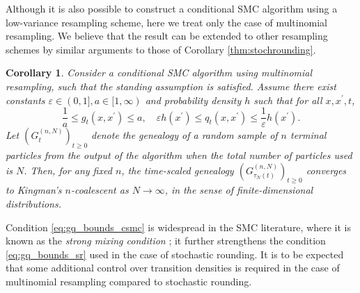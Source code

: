 \documentclass{article} %
\newtheorem{corollary}{Corollary}
\theoremstyle{definition}
\newcommand{\1}[1]{\mathbbm{1}_{\{#1\}}}
\begin{document}
Although it is also possible to construct a conditional SMC algorithm using a low-variance resampling scheme, here we treat only the case of multinomial resampling. We believe that the result can be extended to other resampling schemes by similar arguments to those of Corollary \ref{thm:stochrounding}.

\begin{corollary}\label{thm:CSMC_newassns}
Consider a conditional SMC algorithm using multinomial resampling, such that the standing assumption is satisfied. Assume there exist constants $\varepsilon\in (0,1], a\in [1,\infty)$ and probability density $h$ such that for all $x, x^\prime, t$,
\begin{equation}\label{eq:gq_bounds_csmc}
\frac{1}{a} \leq g_t(x, x^\prime) \leq a , \quad
\varepsilon h(x^\prime) \leq q_t(x, x^\prime) \leq \frac{1}{\varepsilon} h(x^\prime) .
\end{equation}
Let $(G_t^{(n,N)})_{t\geq0}$ denote the genealogy of a random sample of $n$ terminal particles from the output of the algorithm when the total number of particles used is $N$. Then, for any fixed $n$, the time-scaled genealogy $(G_{\tau_N(t)}^{(n,N)})_{t\geq0}$ converges to Kingman's $n$-coalescent as $N\to \infty$, in the sense of finite-dimensional distributions.
\end{corollary}

Condition \eqref{eq:gq_bounds_csmc} is widespread in the SMC literature, where it is known as the \emph{strong mixing condition} \cite[Section 3.5.2]{delmoral2004}; it further strengthens the condition \eqref{eq:gq_bounds_sr} used in the case of stochastic rounding. It is to be expected that some additional control over transition densities is required in the case of multinomial resampling compared to stochastic rounding.
\end{document}
